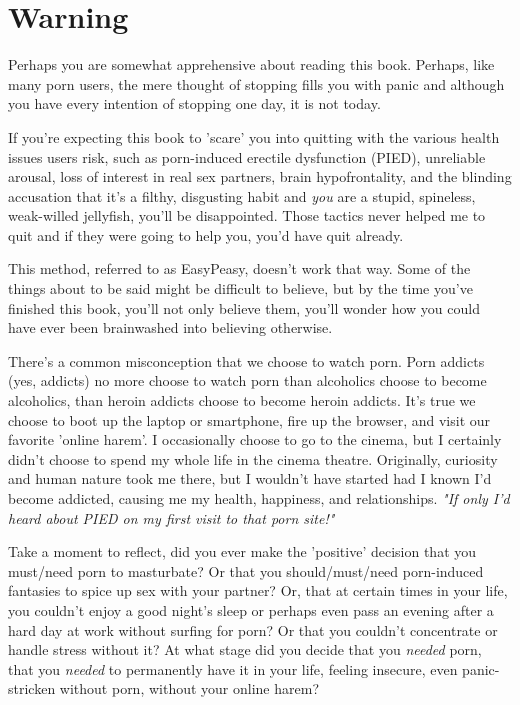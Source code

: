 \documentclass[easypeasy.tex]{subfiles}
\begin{document}
\section{Warning}
 Perhaps you are somewhat apprehensive about reading this book. Perhaps, like many porn users, the mere thought of stopping fills you with panic and although you have every intention of stopping one day, it is not today.

If you're expecting this book to 'scare' you into quitting with the various health issues users risk, such as porn-induced erectile dysfunction (PIED), unreliable arousal, loss of interest in real sex partners, brain hypofrontality, and the blinding accusation that it's a filthy, disgusting habit and \textit{you} are a stupid, spineless, weak-willed jellyfish, you'll be disappointed. Those tactics never helped me to quit and if they were going to help you, you'd have quit already.

This method, referred to as EasyPeasy, doesn't work that way. Some of the things about to be said might be difficult to believe, but by the time you've finished this book, you'll not only believe them, you'll wonder how you could have ever been brainwashed into believing otherwise.

There's a common misconception that we choose to watch porn. Porn addicts (yes, addicts) no more choose to watch porn than alcoholics choose to become alcoholics, than heroin addicts choose to become heroin addicts. It's true we choose to boot up the laptop or smartphone, fire up the browser, and visit our favorite 'online harem'. I occasionally choose to go to the cinema, but I certainly didn't choose to spend my whole life in the cinema theatre. Originally, curiosity and human nature took me there, but I wouldn't have started had I known I'd become addicted, causing me my health, happiness, and relationships.
\textit{"If only I'd heard about PIED on my first visit to that porn site!"}

Take a moment to reflect, did you ever make the 'positive' decision that you must/need porn to masturbate? Or that you should/must/need porn-induced fantasies to spice up sex with your partner? Or, that at certain times in your life, you couldn't enjoy a good night's sleep or perhaps even pass an evening after a hard day at work without surfing for porn? Or that you couldn't concentrate or handle stress without it? At what stage did you decide that you \textit{needed} porn, that you \textit{needed} to permanently have it in your life, feeling insecure, even panic-stricken without porn, without your online harem?
\end{document}
